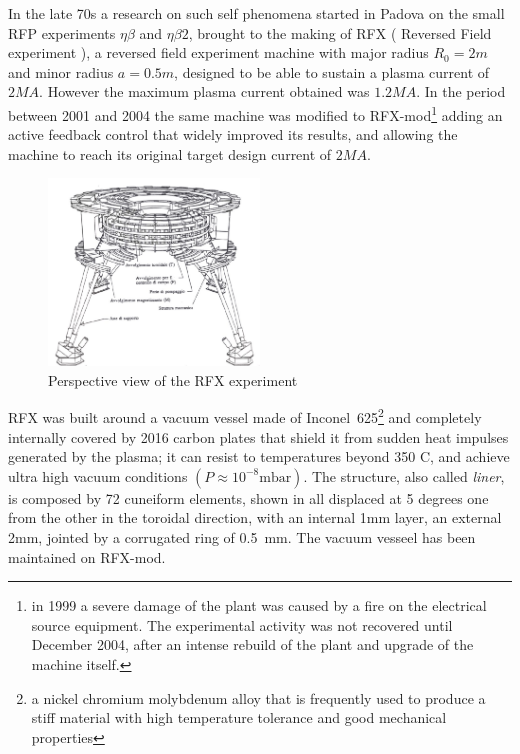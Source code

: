 In the late 70s a research on such self phenomena started in Padova on the small RFP experiments $\eta\beta$ and $\eta\beta 2$, brought to the making of RFX ( Reversed Field experiment ), a reversed field experiment machine with major radius $R_0 = 2m$ and minor radius $a = 0.5m$, designed to be able to sustain a plasma current of $2MA$. However the maximum plasma current obtained was $1.2 MA$. In the period between 2001 and 2004 the same machine was modified to RFX-mod\footnote{in 1999 a severe damage of the plant was caused by a fire on the electrical source equipment. The experimental activity was not recovered until December 2004, after an intense rebuild of the plant and upgrade of the machine itself.} adding an active feedback control that widely improved its results, and allowing the machine to reach its original target design current of $2 MA$.
\begin{figure}[ht!]
\centering
\includegraphics[width=0.5\textwidth]{img/rfx2}
\caption{ Perspective view of the RFX experiment }
\label{img:rfx}
\end{figure}
%
RFX was built around a vacuum vessel made of Inconel~625\footnote{a nickel chromium molybdenum alloy that is frequently used to produce a stiff material with high temperature tolerance and good mechanical properties} and completely internally covered by 2016 carbon plates that shield it from sudden heat impulses generated by the plasma; it can resist to temperatures beyond 350 C, and achieve ultra high vacuum conditions $(P \approx 10^{-8} \text{mbar})$.
The structure, also called \textit{liner}, is composed by 72 cuneiform elements, shown in \Figure{\ref{fig:rfx_liner}} all displaced at 5 degrees one from the other in the toroidal direction, with an internal 1mm layer, an external 2mm, jointed by a corrugated ring of 0.5~mm. The vacuum vesseel has been maintained on RFX-mod.
